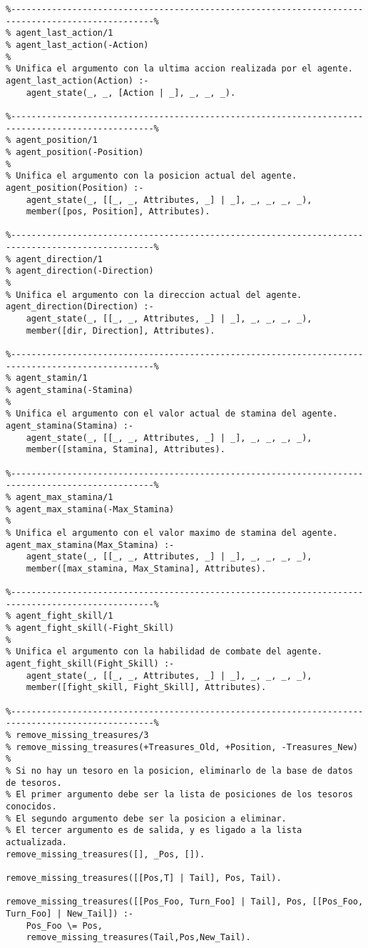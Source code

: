 \documentclass[a4paper,12pt]{report}
\begin{document}
\begin{scriptsize}
\begin{verbatim}
%--------------------------------------------------------------------------------------------------%
% agent_last_action/1
% agent_last_action(-Action)
%
% Unifica el argumento con la ultima accion realizada por el agente.
agent_last_action(Action) :-
    agent_state(_, _, [Action | _], _, _, _).

%--------------------------------------------------------------------------------------------------%
% agent_position/1
% agent_position(-Position)
%
% Unifica el argumento con la posicion actual del agente.
agent_position(Position) :- 
    agent_state(_, [[_, _, Attributes, _] | _], _, _, _, _),
    member([pos, Position], Attributes).

%--------------------------------------------------------------------------------------------------%
% agent_direction/1
% agent_direction(-Direction)
%
% Unifica el argumento con la direccion actual del agente.
agent_direction(Direction) :- 
    agent_state(_, [[_, _, Attributes, _] | _], _, _, _, _),
    member([dir, Direction], Attributes).

%--------------------------------------------------------------------------------------------------%
% agent_stamin/1
% agent_stamina(-Stamina)
%
% Unifica el argumento con el valor actual de stamina del agente. 
agent_stamina(Stamina) :-
    agent_state(_, [[_, _, Attributes, _] | _], _, _, _, _),
    member([stamina, Stamina], Attributes).

%--------------------------------------------------------------------------------------------------%
% agent_max_stamina/1
% agent_max_stamina(-Max_Stamina)
%
% Unifica el argumento con el valor maximo de stamina del agente.  
agent_max_stamina(Max_Stamina) :-
    agent_state(_, [[_, _, Attributes, _] | _], _, _, _, _),
    member([max_stamina, Max_Stamina], Attributes).

%--------------------------------------------------------------------------------------------------%
% agent_fight_skill/1
% agent_fight_skill(-Fight_Skill)
%
% Unifica el argumento con la habilidad de combate del agente. 
agent_fight_skill(Fight_Skill) :- 
    agent_state(_, [[_, _, Attributes, _] | _], _, _, _, _),
    member([fight_skill, Fight_Skill], Attributes).

%--------------------------------------------------------------------------------------------------%
% remove_missing_treasures/3
% remove_missing_treasures(+Treasures_Old, +Position, -Treasures_New)
% 
% Si no hay un tesoro en la posicion, eliminarlo de la base de datos de tesoros.
% El primer argumento debe ser la lista de posiciones de los tesoros conocidos. 
% El segundo argumento debe ser la posicion a eliminar.
% El tercer argumento es de salida, y es ligado a la lista actualizada.
remove_missing_treasures([], _Pos, []).

remove_missing_treasures([[Pos,T] | Tail], Pos, Tail).

remove_missing_treasures([[Pos_Foo, Turn_Foo] | Tail], Pos, [[Pos_Foo, Turn_Foo] | New_Tail]) :- 
    Pos_Foo \= Pos, 
    remove_missing_treasures(Tail,Pos,New_Tail).
\end{verbatim}
\end{scriptsize}
\end{document}
